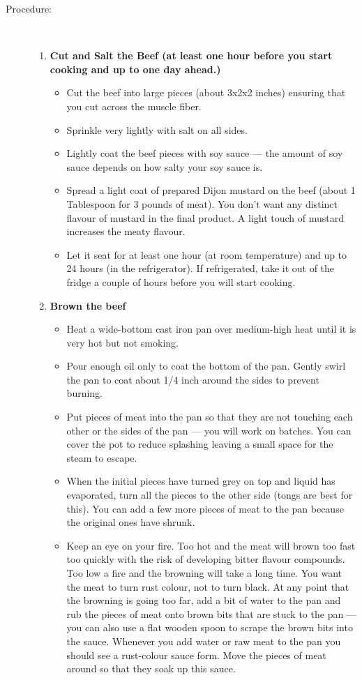 \documentclass[11pt,letterpaper]{article}
\begin{document}
\begin{description}
\item[Procedure:]\ \\
	\begin{enumerate}
	\item {\bf Cut and Salt the Beef (at least one hour before you start cooking and up to one day ahead.)}
	\begin{itemize}
	\item  Cut the beef into large pieces (about 3x2x2 inches) ensuring that you cut across the muscle fiber.
	\item Sprinkle very lightly with salt on all sides.
	\item Lightly coat the beef pieces with soy sauce --- the amount of soy sauce depends on how salty your soy sauce is.
	\item Spread a light coat of prepared Dijon mustard on the beef (about 1 Tablespoon for 3 pounds of meat). You don't want any distinct flavour of mustard in the final product. A light touch of mustard increases the meaty flavour.
	\item Let it seat for at least one hour (at room temperature) and up to 24 hours (in the refrigerator). If refrigerated, take it out of the fridge a couple of hours before you will start cooking.
	\end{itemize}
	\item {\bf Brown the beef}
	\begin{itemize}
	\item Heat a wide-bottom cast iron pan over medium-high heat until it is very hot but not smoking.
	 \item Pour enough oil only to coat the bottom of the pan. Gently swirl the pan to coat about 1/4 inch around the sides to prevent burning.
	 \item Put pieces of meat into the pan so that they are not touching each other or the sides of the pan --- you will work on batches. You can cover the pot to reduce splashing leaving a small space for the steam to escape. 
	  \item When the initial pieces have turned grey on top and liquid has evaporated, turn all the pieces to the other side (tongs are best for this). You can add a few more pieces of meat to the pan because the original ones have shrunk.
	 \item Keep an eye on your fire. Too hot and the meat will brown too fast too quickly with the risk of developing bitter flavour compounds. Too low a fire and the browning will take a long time. You want the meat to turn rust colour, not to turn black. At any point that the browning is going too far, add a bit of water to the pan and rub the pieces of meat onto brown bits that are stuck to the pan --- you can also use a flat wooden spoon to scrape the brown bits into the sauce. Whenever you add water or raw meat to the pan you should see a rust-colour sauce form. Move the pieces of meat around so that they soak up this sauce.

\end{itemize}
\end{enumerate}
\end{description}
\end{document}
